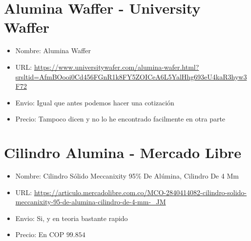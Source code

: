 \documentclass[a4paper]{article}
\begin{document}
\section{Alumina Waffer - University Waffer}
\begin{itemize}
  \item Nombre: Alumina Waffer
  \item URL: \url{https://www.universitywafer.com/alumina-wafer.html?srsltid=AfmBOooi0Cd456FGnR1k8FY5ZOICeA6L5YalHhg693eU4kaR3hyw3F72}
  \item Envio: Igual que antes podemos hacer una cotización
  \item Precio: Tampoco dicen y no lo he encontrado facilmente en otra parte
\end{itemize}

\section{Cilindro Alumina - Mercado Libre}
\begin{itemize}
  \item Nombre: Cilindro Sólido Meccanixity 95\% De Alúmina, Cilindro De 4 Mm
  \item URL: \url{https://articulo.mercadolibre.com.co/MCO-2840414082-cilindro-solido-meccanixity-95-de-alumina-cilindro-de-4-mm-_JM}
  \item Envio: Si, y en teoria bastante rapido
  \item Precio: En COP $99.854$
\end{itemize}
\end{document}
